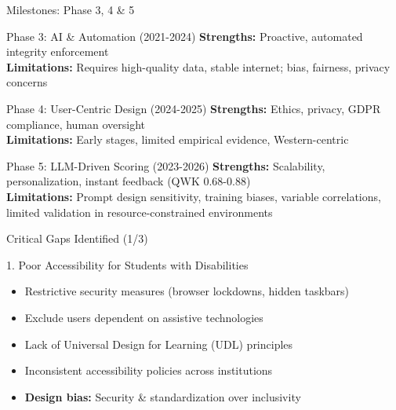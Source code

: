 \begin{frame}{Milestones: Phase 3, 4 \& 5}
    \begin{block}{Phase 3: AI \& Automation (2021-2024)}
        \textbf{Strengths:} Proactive, automated integrity enforcement \\
        \textbf{Limitations:} Requires high-quality data, stable internet; bias, fairness, privacy concerns
    \end{block}
    
    \begin{block}{Phase 4: User-Centric Design (2024-2025)}
        \textbf{Strengths:} Ethics, privacy, GDPR compliance, human oversight \\
        \textbf{Limitations:} Early stages, limited empirical evidence, Western-centric
    \end{block}
    
    \begin{block}{Phase 5: LLM-Driven Scoring (2023-2026)}
        \textbf{Strengths:} Scalability, personalization, instant feedback (QWK 0.68-0.88) \\
        \textbf{Limitations:} Prompt design sensitivity, training biases, variable correlations, limited validation in resource-constrained environments
    \end{block}
\end{frame}

\begin{frame}{Critical Gaps Identified (1/3)}
    \begin{alertblock}{1. Poor Accessibility for Students with Disabilities}
        \begin{itemize}
            \item Restrictive security measures (browser lockdowns, hidden taskbars)
            \item Exclude users dependent on assistive technologies
            \item Lack of Universal Design for Learning (UDL) principles
            \item Inconsistent accessibility policies across institutions
            \item \textbf{Design bias:} Security \& standardization over inclusivity
        \end{itemize}
    \end{alertblock}
\end{frame}

